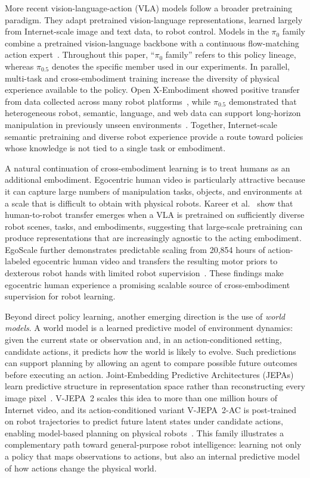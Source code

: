 \documentclass[10pt,conference]{IEEEtran}
\newcommand{\pio}{\ensuremath{\pi_0}}
\begin{document}
More recent vision-language-action (VLA) models follow a broader pretraining
paradigm. They adapt pretrained vision-language representations, learned largely
from Internet-scale image and text data, to robot control. Models in the
\pio{} family combine a pretrained vision-language backbone with a continuous
flow-matching action expert~\cite{black2024pi0}. Throughout this paper,
``\pio{} family'' refers to this policy lineage, whereas $\pi_{0.5}$ denotes the
specific member used in our experiments. In parallel, multi-task and
cross-embodiment training increase the diversity of physical experience
available to the policy. Open X-Embodiment showed positive transfer from data
collected across many robot platforms~\cite{openx2023}, while
$\pi_{0.5}$ demonstrated that heterogeneous robot, semantic, language, and web
data can support long-horizon manipulation in previously unseen
environments~\cite{black2025pi05}. Together, Internet-scale semantic pretraining
and diverse robot experience provide a route toward policies whose knowledge is
not tied to a single task or embodiment.

A natural continuation of cross-embodiment learning is to treat humans as an
additional embodiment. Egocentric human video is particularly attractive because
it can capture large numbers of manipulation tasks, objects, and environments at
a scale that is difficult to obtain with physical robots. Kareer et
al.~\cite{kareer2025humanrobot} show that human-to-robot transfer emerges when a
VLA is pretrained on sufficiently diverse robot scenes, tasks, and embodiments,
suggesting that large-scale pretraining can produce representations that are
increasingly agnostic to the acting embodiment. EgoScale further demonstrates
predictable scaling from 20,854 hours of action-labeled egocentric human video
and transfers the resulting motor priors to dexterous robot hands with limited
robot supervision~\cite{zheng2026egoscale}. These findings make egocentric human
experience a promising scalable source of cross-embodiment supervision for robot
learning.

Beyond direct policy learning, another emerging direction is the use of
\emph{world models}. A world model is a learned predictive model of environment
dynamics: given the current state or observation and, in an action-conditioned
setting, candidate actions, it predicts how the world is likely to evolve. Such
predictions can support planning by allowing an agent to compare possible future
outcomes before executing an action. Joint-Embedding Predictive Architectures
(JEPAs) learn predictive structure in representation space rather than
reconstructing every image pixel~\cite{lecun2022path}. V-JEPA~2 scales this idea
to more than one million hours of Internet video, and its action-conditioned
variant V-JEPA~2-AC is post-trained on robot trajectories to predict future
latent states under candidate actions, enabling model-based planning on physical
robots~\cite{assran2025vjepa2}. This family illustrates a complementary path
toward general-purpose robot intelligence: learning not only a policy that maps
observations to actions, but also an internal predictive model of how actions
change the physical world.
\end{document}
